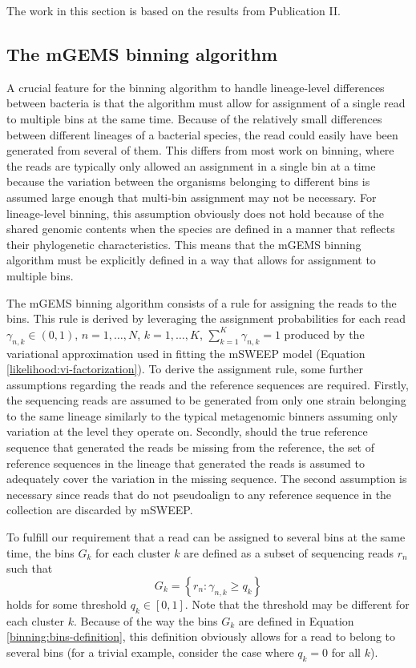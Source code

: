 \documentclass[officiallayout]{tktla}
\begin{document}
The work in this section is based on the results from Publication
II.

\subsection{The mGEMS binning algorithm}

A crucial feature for the binning algorithm to handle lineage-level
differences between bacteria is that the algorithm must allow for
assignment of a single read to multiple bins at the same time. Because
of the relatively small differences between different lineages of a
bacterial species, the read could easily have been generated from
several of them. This differs from most work on binning, where the
reads are typically only allowed an assignment in a single bin at a
time because the variation between the organisms belonging to
different bins is assumed large enough that multi-bin assignment may
not be necessary. For lineage-level binning, this
assumption obviously does not hold because of the shared genomic
contents when the species are defined in a manner that reflects their
phylogenetic characteristics. This means that the mGEMS binning
algorithm must be explicitly defined in a way that allows for
assignment to multiple bins.

The mGEMS binning algorithm consists of a rule for assigning the reads
to the bins. This rule is derived by leveraging the assignment
probabilities for each read $\gamma_{n, k} \in \left(0, 1\right)$, $n
= 1, \dots, N$, $k = 1, \dots, K$, $\sum_{k = 1}^{K}\gamma_{n, k} = 1$
produced by the variational approximation used in fitting the mSWEEP
model (Equation \ref{likelihood:vi-factorization}). To derive the
assignment rule, some further assumptions regarding the reads and the
reference sequences are required. Firstly, the sequencing reads are
assumed to be generated from only one strain belonging to the same
lineage \textemdash{ } similarly to the typical metagenomic binners
assuming only variation at the level they operate on. Secondly, should
the true reference sequence that generated the reads be missing from
the reference, the set of reference sequences in the lineage that
generated the reads is assumed to adequately cover the variation in
the missing sequence. The second assumption is necessary since reads
that do not pseudoalign to any reference sequence in the collection
are discarded by mSWEEP.

To fulfill our requirement that a read can be assigned to several bins
at the same time, the bins $G_{k}$ for each cluster $k$ are defined as
a subset of sequencing reads $r_{n}$ such that
\begin{equation}
  \label{binning:bins-definition}
  G_{k} = \left\{r_{n} : \gamma_{n, k} \geq q_{k}\right\}
\end{equation}
holds for some threshold $q_{k} \in \left[0, 1\right]$. Note that the
threshold may be different for each cluster $k$. Because of the way
the bins $G_{k}$ are defined in Equation
\ref{binning:bins-definition}, this definition obviously allows for
a read to belong to several bins (for a trivial example, consider
the case where $q_{k} = 0$ for all $k$).
\end{document}
